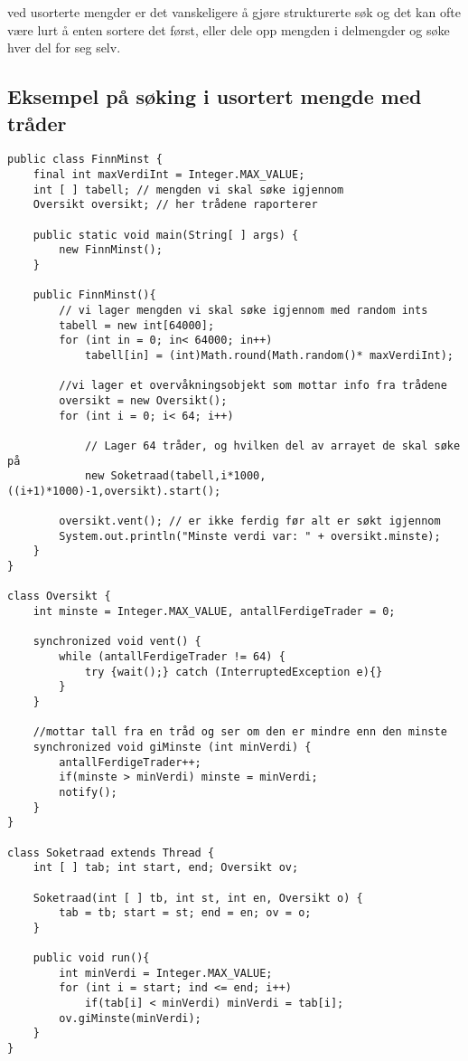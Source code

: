\documentclass[a4paper,norsk,10pt]{article}
\begin{document}
  ved usorterte mengder er det vanskeligere å gjøre strukturerte søk og det kan ofte
  være lurt å enten sortere det først, eller dele opp mengden i delmengder og søke hver
  del for seg selv.
\subsection{Eksempel på søking i usortert mengde med tråder}
\label{sec-14.1}


\begin{verbatim}
public class FinnMinst {
    final int maxVerdiInt = Integer.MAX_VALUE;
    int [ ] tabell; // mengden vi skal søke igjennom
    Oversikt oversikt; // her trådene raporterer

    public static void main(String[ ] args) {
        new FinnMinst();
    }

    public FinnMinst(){
        // vi lager mengden vi skal søke igjennom med random ints
        tabell = new int[64000];
        for (int in = 0; in< 64000; in++) 
            tabell[in] = (int)Math.round(Math.random()* maxVerdiInt);

        //vi lager et overvåkningsobjekt som mottar info fra trådene
        oversikt = new Oversikt();
        for (int i = 0; i< 64; i++)

            // Lager 64 tråder, og hvilken del av arrayet de skal søke på
            new Soketraad(tabell,i*1000,((i+1)*1000)-1,oversikt).start(); 

        oversikt.vent(); // er ikke ferdig før alt er søkt igjennom
        System.out.println("Minste verdi var: " + oversikt.minste);
    }
}

class Oversikt {
    int minste = Integer.MAX_VALUE, antallFerdigeTrader = 0;  
    
    synchronized void vent() {
        while (antallFerdigeTrader != 64) {
            try {wait();} catch (InterruptedException e){}      
        }
    } 

    //mottar tall fra en tråd og ser om den er mindre enn den minste
    synchronized void giMinste (int minVerdi) {
        antallFerdigeTrader++;
        if(minste > minVerdi) minste = minVerdi;      
        notify();
    }
}

class Soketraad extends Thread {
    int [ ] tab; int start, end; Oversikt ov;
  
    Soketraad(int [ ] tb, int st, int en, Oversikt o) {
        tab = tb; start = st; end = en; ov = o; 
    }
 
    public void run(){
        int minVerdi = Integer.MAX_VALUE;     
        for (int i = start; ind <= end; i++)
            if(tab[i] < minVerdi) minVerdi = tab[i];
        ov.giMinste(minVerdi);
    } 
}
\end{verbatim}
\end{document}
